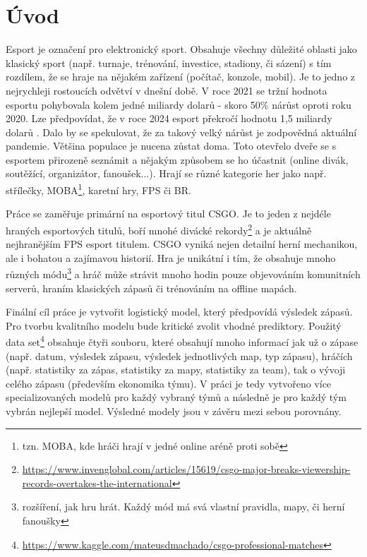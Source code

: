 \chapter{Úvod}
Esport je označení pro elektronický sport. Obsahuje všechny důležité oblasti jako klasický sport (např. turnaje, trénování, investice, stadiony, či sázení)
s tím rozdílem, že se hraje na nějakém zařízení (počítač, konzole, mobil).
Je to jedno z nejrychleji rostoucích odvětví v dnešní době. V roce 2021 se tržní hodnota esportu pohybovala kolem jedné miliardy dolarů - skoro
50\% nárůst oproti roku 2020. Lze předpovídat, že v roce 2024 esport překročí hodnotu 1,5 miliardy dolarů \cite{Gough2021}.
Dalo by se spekulovat, že za takový velký nárůst je zodpovědná aktuální pandemie. Většina populace je nucena zůstat doma. Toto otevřelo dveře
se s esportem přirozeně seznámit a nějakým způsobem se ho účastnit (online divák, soutěžící, organizátor, fanoušek...). 
Hrají se různé kategorie her
{\color{red}
jako např.
}
střílečky, \ac{MOBA}\footnote{tzn. MOBA, kde hráči hrají v jedné online aréně proti sobě}, karetní hry, \ac{FPS} či \ac{BR}.

Práce se zaměřuje primární na esportový titul \acf{CSGO}. Je to jeden z nejdéle hraných esportových titulů, boří mnohé divácké
rekordy\footnote{\scriptsize \url{https://www.invenglobal.com/articles/15619/csgo-major-breaks-viewership-records-overtakes-the-international}}
a je aktuálně nejhranějším \ac{FPS} esport titulem. \ac{CSGO} vyniká nejen detailní herní mechanikou, ale i bohatou a zajímavou historií. Hra
je unikátní i tím, že obsahuje mnoho různých módu\footnote{rozšíření, jak hru hrát. Každý mód má svá vlastní pravidla, mapy, či herní fanoušky}
a hráč může strávit mnoho hodin pouze objevováním komunitních serverů, hraním klasických zápasů či trénováním na offline mapách.

{\color{red}
Finální cíl práce je vytvořit logistický model, který předpovídá výsledek zápasů. Pro tvorbu kvalitního modelu bude kritické zvolit vhodné prediktory. Použitý data
set\footnote{\url{https://www.kaggle.com/mateusdmachado/csgo-professional-matches}} obsahuje čtyři souboru, které obsahují mnoho informací jak už o zápase (např. datum, 
výsledek zápasu, výsledek jednotlivých map, typ zápasu), hráčích (např. statistiky za zápas, statistiky za mapy, statistiky za team), tak o 
vývoji celého zápasu (především ekonomika týmu). V práci je tedy vytvořeno více specializovaných modelů pro každý vybraný týmů a následně
je pro každý tým vybrán nejlepší model. Výsledné modely jsou v závěru mezi sebou porovnány.
}

